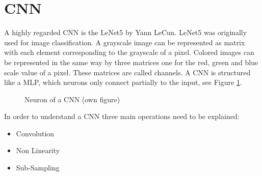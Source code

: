 	\section{\ac{CNN}}
		A highly regarded \ac{CNN} is the LeNet5 by Yann LeCun. LeNet5 was originally used for image classification. A grayscale image can be represented as matrix with each element corresponding to the grayscale of a pixel. Colored images can be represented in the same way by three matrices one for the red, green and blue scale value of a pixel. These matrices are called channels. A \ac{CNN} is structured like a \ac{MLP}, which neurons only connect partially to the input, see Figure \ref{img:cnn:neuron}. \autocite{LeCun.1998}
		\begin{figure}[H]
			\centering
			
			\caption{Neuron of a \ac{CNN} (own figure)} \label{img:cnn:neuron}
		\end{figure}
		In order to understand a \ac{CNN} three main operations need to be explained:
		\begin{itemize}
			\item Convolution
			\item Non Linearity
			\item Sub-Sampling
		\end{itemize}
